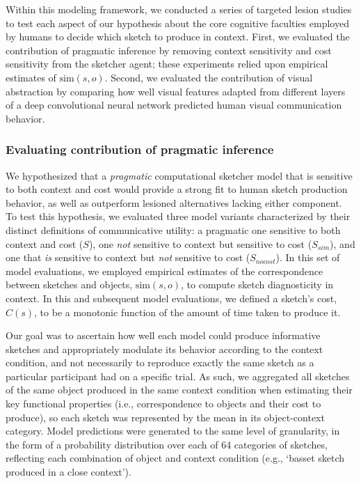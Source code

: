 \documentclass[9pt,twocolumn,twoside]{pnas-new}
\begin{document}

Within this modeling framework, we conducted a series of targeted lesion studies to test each aspect of our hypothesis about the core cognitive faculties employed by humans to decide which sketch to produce in context. 
First, we evaluated the contribution of pragmatic inference by removing context sensitivity and cost sensitivity from the sketcher agent; these experiments relied upon empirical estimates of $\textrm{sim}(s,o)$. 
Second, we evaluated the contribution of visual abstraction by comparing how well visual features adapted from different layers of a deep convolutional neural network predicted human visual communication behavior. 

\subsubsection*{Evaluating contribution of pragmatic inference}

We hypothesized that a \textit{pragmatic} computational sketcher model that is sensitive to both context and cost would provide a strong fit to human sketch production behavior, as well as outperform lesioned alternatives lacking either component.
To test this hypothesis, we evaluated three model variants characterized by their distinct definitions of communicative utility: a pragmatic one sensitive to both context and cost ($S$), one \textit{not} sensitive to context but sensitive to cost ($S_{sim}$), and one that \textit{is} sensitive to context but \textit{not} sensitive to cost ($S_{nocost}$).
In this set of model evaluations, we employed empirical estimates of the correspondence between sketches and objects, $\textrm{sim}(s,o)$, to compute sketch diagnosticity in context. 
In this and subsequent model evaluations, we defined a sketch's cost, $C(s)$, to be a monotonic function of the amount of time taken to produce it.

Our goal was to ascertain how well each model could produce informative sketches and appropriately modulate its behavior according to the context condition, and not necessarily to reproduce exactly the same sketch as a particular participant had on a specific trial. 
As such, we aggregated all sketches of the same object produced in the same context condition when estimating their key functional properties (i.e., correspondence to objects and their cost to produce), so each sketch was represented by the mean in its object-context category. 
Model predictions were generated to the same level of granularity, in the form of a probability distribution over each of 64 categories of sketches, reflecting each combination of object and context condition (e.g., `basset sketch produced in a close context'). 
\end{document}

